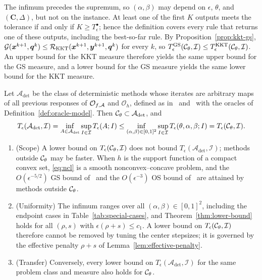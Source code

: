 The infimum precedes the supremum, so \((\alpha,\beta)\) may depend on
\(\epsilon\), \(\theta\), and \((\mathbf C,\Delta)\), but not on the instance.
At least one of the first \(K\) outputs meets the tolerance if and only if
\(K\ge T^{\bullet}_\epsilon\); hence the definition covers every rule that
returns one of these outputs, including the best-so-far rule. By
Proposition~\ref{prop:kkt-gs},
\(\mathcal{G}(\bm{x}^{k+1},\bm{q}^k)\le\mathcal R_{\mathrm{KKT}}(\bm{x}^{k+1},\bm{y}^{k+1},\bm{q}^k)\)
for every \(k\), so
\(T^{\mathrm{GS}}_\epsilon(\mathcal{C}_\theta,\mathcal I)
\le T^{\mathrm{KKT}}_\epsilon(\mathcal{C}_\theta,\mathcal I)\). An upper bound for
the KKT measure therefore yields the same upper bound for the GS measure, and
a lower bound for the GS measure yields the same lower bound for the KKT
measure.

\begin{remark}
\label{rem:family-not-oracle}
Let \(\mathcal A_{\det}\) be the class of deterministic methods whose iterates
are arbitrary maps of all previous responses of \(\mathcal O_{f,\mathcal{A}}\) and
\(\mathcal O_h\), defined as in~\cite[Section~2.2]{carmon2020lower}
and~\cite[Definition~2.5]{pan2026optimal} with the oracles of
Definition~\ref{def:oracle-model}. Then \(\mathcal{C}_\theta\subset\mathcal A_{\det}\), and
\[
    T_\epsilon(\mathcal A_{\det},\mathcal I)
    =\inf_{A\in\mathcal A_{\det}}\sup_{I\in\mathcal I}T_\epsilon(A;I)
    \le\inf_{(\alpha,\beta)\in[0,1]^2}\sup_{I\in\mathcal I}
    T_\epsilon(\theta,\alpha,\beta;I)
    =T_\epsilon(\mathcal{C}_\theta,\mathcal I).
\]
\begin{enumerate}[label=(\roman*)]
\item (Scope) A lower bound on \(T_\epsilon(\mathcal{C}_\theta,\mathcal I)\) does not
  bound \(T_\epsilon(\mathcal A_{\det},\mathcal I)\); methods outside
  \(\mathcal{C}_\theta\) may be faster. When \(h\) is the support function of a
  compact convex set, \eqref{eq:ncl} is a smooth nonconvex--concave problem,
  and the \(O(\epsilon^{-5/2})\) GS bound of~\cite{zhang2026matching} and the
  \(O(\epsilon^{-3})\) OS bound of~\cite{pan2026optimal} are attained by
  methods outside \(\mathcal{C}_\theta\).
\item (Uniformity) The infimum ranges over all \((\alpha,\beta)\in[0,1]^2\),
  including the endpoint cases in Table~\ref{tab:special-cases}, and
  Theorem~\ref{thm:lower-bound} holds for all \((\rho,s)\) with
  \(\epsilon(\rho+s)\le c_1\). A lower bound on
  \(T_\epsilon(\mathcal{C}_\theta,\mathcal I)\) therefore cannot be removed by
  tuning the center stepsizes; it is governed by the effective penalty
  \(\rho+s\) of Lemma~\ref{lem:effective-penalty}.
\item (Transfer) Conversely, every lower bound on
  \(T_\epsilon(\mathcal A_{\det},\mathcal I)\) for the same problem class and
  measure also holds for \(\mathcal{C}_\theta\).
\end{enumerate}
\end{remark}

